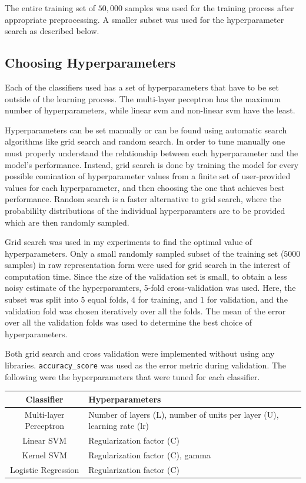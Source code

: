 \documentclass[12pt]{article}
\begin{document}
The entire training set of $50,000$ samples was used for the training process after appropriate preprocessing. A smaller subset was used for the hyperparameter search as described below.

\subsection*{Choosing Hyperparameters}

Each of the classifiers used has a set of hyperparameters that have to be set outside of the learning process. The multi-layer peceptron has the maximum number of hyperparameters, while linear svm and non-linear svm have the least.

Hyperparameters can be set manually or can be found using automatic search algorithms like grid search and random search. In order to tune manually one must properly understand the relationship between each hyperparameter and the model's performance. Instead, grid search is done by training the model for every possible comination of hyperparameter values from a finite set of user-provided values for each hyperparameter, and then choosing the one that achieves best performance. Random search is a faster alternative to grid search, where the probabililty distributions of the individual hyperparamters are to be provided which are then randomly sampled.

Grid search was used in my experiments to find the optimal value of hyperparameters. Only a small randomly sampled subset of the training set ($5000$ samples) in raw representation form were used for grid search in the interest of computation time. Since the size of the validation set is small, to obtain a less noisy estimate of the hyperparamters, 5-fold cross-validation was used. Here, the subset was split into $5$ equal folds, $4$ for training, and $1$ for validation, and the validation fold was chosen iteratively over all the folds. The mean of the error over all the validation folds was used to determine the best choice of hyperparameters. 

Both grid search and cross validation were implemented without using any libraries. \texttt{accuracy\_score} was used as the error metric during validation. The following were the hyperparameters that were tuned for each classifier.

\begin{center}
 \begin{tabular}{|c|m{10em}|}
 \hline
 Classifier & Hyperparameters \\
 \hline
 Multi-layer Perceptron & Number of layers (L), number of units per layer (U), learning rate (lr) \\
 \hline
 Linear SVM & Regularization factor (C) \\
 \hline
 Kernel SVM & Regularization factor (C), gamma\\
 \hline
 Logistic Regression & Regularization factor (C) \\
 \hline
 \end{tabular}
\end{center}
\end{document}
